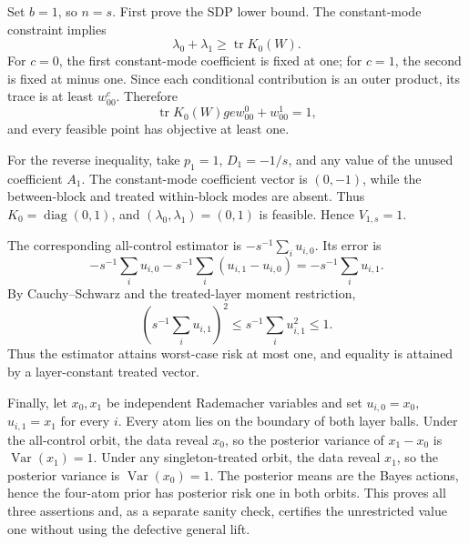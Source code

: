 Set \(b=1\), so \(n=s\).  First prove the SDP lower bound.  The constant-mode constraint implies
\[
\lambda_0+\lambda_1\ge\operatorname{tr}K_0(W).
\]
For \(c=0\), the first constant-mode coefficient is fixed at one; for \(c=1\), the second is fixed at minus one.  Since each conditional contribution is an outer product, its trace is at least \(w^c_{00}\).  Therefore
\[
\operatorname{tr}K_0(W)ge w^0_{00}+w^1_{00}=1,
\]
and every feasible point has objective at least one.

For the reverse inequality, take \(p_1=1\), \(D_1=-1/s\), and any value of the unused coefficient \(A_1\).  The constant-mode coefficient vector is \((0,-1)\), while the between-block and treated within-block modes are absent.  Thus \(K_0=\operatorname{diag}(0,1)\), and \((\lambda_0,\lambda_1)=(0,1)\) is feasible.  Hence \(V_{1,s}=1\).

The corresponding all-control estimator is \(-s^{-1}\sum_i u_{i,0}\).  Its error is
\[
-s^{-1}\sum_i u_{i,0}
-s^{-1}\sum_i(u_{i,1}-u_{i,0})
=-s^{-1}\sum_i u_{i,1}.
\]
By Cauchy--Schwarz and the treated-layer moment restriction,
\[
\left(s^{-1}\sum_i u_{i,1}\right)^2
\le s^{-1}\sum_i u_{i,1}^2\le1.
\]
Thus the estimator attains worst-case risk at most one, and equality is attained by a layer-constant treated vector.

Finally, let \(x_0,x_1\) be independent Rademacher variables and set \(u_{i,0}=x_0\), \(u_{i,1}=x_1\) for every \(i\).  Every atom lies on the boundary of both layer balls.  Under the all-control orbit, the data reveal \(x_0\), so the posterior variance of \(x_1-x_0\) is \(\operatorname{Var}(x_1)=1\).  Under any singleton-treated orbit, the data reveal \(x_1\), so the posterior variance is \(\operatorname{Var}(x_0)=1\).  The posterior means are the Bayes actions, hence the four-atom prior has posterior risk one in both orbits.  This proves all three assertions and, as a separate sanity check, certifies the unrestricted value one without using the defective general lift.